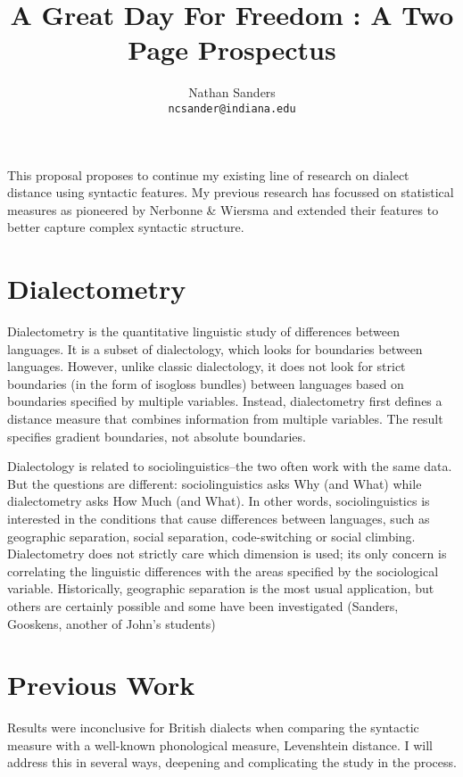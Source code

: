 \documentclass[11pt]{article}
\author{Nathan Sanders \\ \tt{ncsander@indiana.edu}}
\title{A Great Day For Freedom : A Two Page Prospectus}
\begin{document}
\maketitle
%

This proposal proposes to continue my existing line of research on
dialect distance using syntactic features. My previous research has
focussed on statistical measures as pioneered by Nerbonne \& Wiersma
and extended their features to better capture complex syntactic
structure.

\section{Dialectometry}

Dialectometry is the quantitative linguistic study of differences
between languages. It is a subset of dialectology, which looks for
boundaries between languages. However, unlike classic dialectology, it
does not look for strict boundaries (in the form of isogloss bundles)
between languages based on boundaries specified by multiple
variables. Instead, dialectometry first defines a distance measure
that combines information from multiple variables. The result
specifies gradient boundaries, not absolute boundaries.

Dialectology is related to sociolinguistics--the two often work with
the same data. But the questions are different: sociolinguistics asks
Why (and What) while dialectometry asks How Much (and What).
In other words, sociolinguistics is interested in the conditions that cause
differences between languages, such as geographic separation, social
separation, code-switching or social climbing. Dialectometry does not
strictly care which dimension is used; its only concern is correlating
the linguistic differences with the areas specified by the
sociological variable. Historically, geographic separation is the most
usual application, but others are certainly possible and some have
been investigated (Sanders, Gooskens, another of John's students)

\section{Previous Work}

Results were inconclusive for British dialects when comparing the
syntactic measure with a well-known phonological measure, Levenshtein
distance. I will address this in several ways, deepening and
complicating the study in the process.
\end{document}
